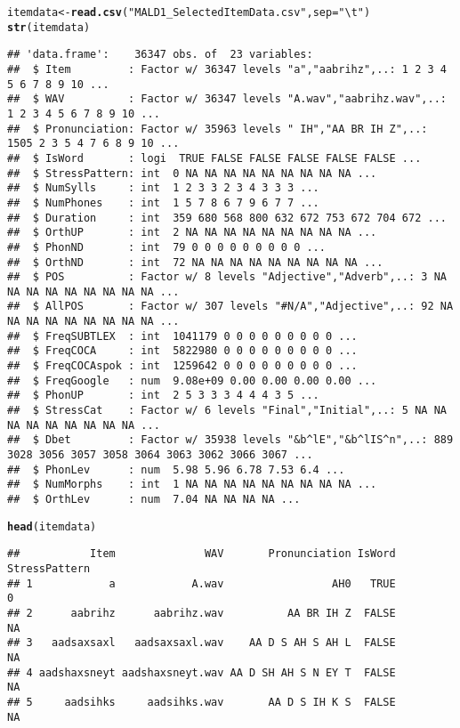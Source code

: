 \documentclass{article}\usepackage[]{graphicx}\usepackage[]{color}
\makeatletter
\newcommand{\hlstr}[1]{\textcolor[rgb]{0.192,0.494,0.8}{#1}}%
\newcommand{\hlstd}[1]{\textcolor[rgb]{0.345,0.345,0.345}{#1}}%
\newcommand{\hlkwb}[1]{\textcolor[rgb]{0.69,0.353,0.396}{#1}}%
\newcommand{\hlkwc}[1]{\textcolor[rgb]{0.333,0.667,0.333}{#1}}%
\newcommand{\hlkwd}[1]{\textcolor[rgb]{0.737,0.353,0.396}{\textbf{#1}}}%
\newenvironment{kframe}{%
 \def\at@end@of@kframe{}%
 \ifinner\ifhmode%
  \def\at@end@of@kframe{\end{minipage}}%
  \begin{minipage}{\columnwidth}%
 \fi\fi%
 \def\FrameCommand##1{\hskip\@totalleftmargin \hskip-\fboxsep
 \colorbox{shadecolor}{##1}\hskip-\fboxsep
     \hskip-\linewidth \hskip-\@totalleftmargin \hskip\columnwidth}%
 \MakeFramed {\advance\hsize-\width
   \@totalleftmargin\z@ \linewidth\hsize
   \@setminipage}}%
 {\par\unskip\endMakeFramed%
 \at@end@of@kframe}
\newenvironment{knitrout}{}{} %
\makeatother
\begin{document}
\begin{knitrout}
\begin{kframe}
\begin{alltt}
\hlstd{itemdata} \hlkwb{<-} \hlkwd{read.csv}\hlstd{(}\hlstr{"MALD1_SelectedItemData.csv"}\hlstd{,} \hlkwc{sep} \hlstd{=} \hlstr{"\textbackslash{}t"}\hlstd{)}
\hlkwd{str}\hlstd{(itemdata)}
\end{alltt}
\begin{verbatim}
## 'data.frame':	36347 obs. of  23 variables:
##  $ Item         : Factor w/ 36347 levels "a","aabrihz",..: 1 2 3 4 5 6 7 8 9 10 ...
##  $ WAV          : Factor w/ 36347 levels "A.wav","aabrihz.wav",..: 1 2 3 4 5 6 7 8 9 10 ...
##  $ Pronunciation: Factor w/ 35963 levels " IH","AA BR IH Z",..: 1505 2 3 5 4 7 6 8 9 10 ...
##  $ IsWord       : logi  TRUE FALSE FALSE FALSE FALSE FALSE ...
##  $ StressPattern: int  0 NA NA NA NA NA NA NA NA NA ...
##  $ NumSylls     : int  1 2 3 3 2 3 4 3 3 3 ...
##  $ NumPhones    : int  1 5 7 8 6 7 9 6 7 7 ...
##  $ Duration     : int  359 680 568 800 632 672 753 672 704 672 ...
##  $ OrthUP       : int  2 NA NA NA NA NA NA NA NA NA ...
##  $ PhonND       : int  79 0 0 0 0 0 0 0 0 0 ...
##  $ OrthND       : int  72 NA NA NA NA NA NA NA NA NA ...
##  $ POS          : Factor w/ 8 levels "Adjective","Adverb",..: 3 NA NA NA NA NA NA NA NA NA ...
##  $ AllPOS       : Factor w/ 307 levels "#N/A","Adjective",..: 92 NA NA NA NA NA NA NA NA NA ...
##  $ FreqSUBTLEX  : int  1041179 0 0 0 0 0 0 0 0 0 ...
##  $ FreqCOCA     : int  5822980 0 0 0 0 0 0 0 0 0 ...
##  $ FreqCOCAspok : int  1259642 0 0 0 0 0 0 0 0 0 ...
##  $ FreqGoogle   : num  9.08e+09 0.00 0.00 0.00 0.00 ...
##  $ PhonUP       : int  2 5 3 3 3 4 4 4 3 5 ...
##  $ StressCat    : Factor w/ 6 levels "Final","Initial",..: 5 NA NA NA NA NA NA NA NA NA ...
##  $ Dbet         : Factor w/ 35938 levels "&b^lE","&b^lIS^n",..: 889 3028 3056 3057 3058 3064 3063 3062 3066 3067 ...
##  $ PhonLev      : num  5.98 5.96 6.78 7.53 6.4 ...
##  $ NumMorphs    : int  1 NA NA NA NA NA NA NA NA NA ...
##  $ OrthLev      : num  7.04 NA NA NA NA ...
\end{verbatim}
\begin{alltt}
\hlkwd{head}\hlstd{(itemdata)}
\end{alltt}
\begin{verbatim}
##           Item              WAV       Pronunciation IsWord StressPattern
## 1            a            A.wav                 AH0   TRUE             0
## 2      aabrihz      aabrihz.wav          AA BR IH Z  FALSE            NA
## 3   aadsaxsaxl   aadsaxsaxl.wav    AA D S AH S AH L  FALSE            NA
## 4 aadshaxsneyt aadshaxsneyt.wav AA D SH AH S N EY T  FALSE            NA
## 5     aadsihks     aadsihks.wav       AA D S IH K S  FALSE            NA

\end{verbatim}
\end{kframe}
\end{knitrout}
\end{document}
